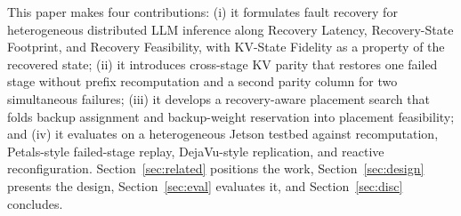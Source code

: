 This paper makes four contributions: (i) it formulates fault recovery for
heterogeneous distributed LLM inference along Recovery Latency,
Recovery-State Footprint, and Recovery Feasibility, with KV-State Fidelity as
a property of the recovered state; (ii) it introduces cross-stage KV parity that
restores one failed stage without prefix recomputation and a second parity
column for two simultaneous failures; (iii) it develops a recovery-aware placement
search that folds backup assignment and backup-weight reservation into
placement feasibility; and (iv) it evaluates \sys{} on a heterogeneous Jetson
testbed against recomputation, Petals-style failed-stage replay,
DejaVu-style replication, and reactive reconfiguration.  Section~\ref{sec:related}
positions the work, Section~\ref{sec:design} presents the design,
Section~\ref{sec:eval} evaluates it, and Section~\ref{sec:disc} concludes.
